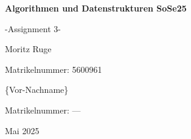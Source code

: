 \begin{titlepage}
    \centering
    \vspace*{3cm}
    {\Huge\bfseries Algorithmen und Datenstrukturen SoSe25 \par}
    \vspace{0.5cm}
    {\Huge -Assignment 3- \par}
    \vspace{1cm}
    {\Large Moritz Ruge \par}
    \vspace{0.1cm}
    {\small Matrikelnummer: 5600961 \par}
    {\Large \{Vor-Nachname\} \par}
    \vspace{0.1cm}
    {\small Matrikelnummer: ---\par}
    \vfill
    {\large Mai 2025}
\end{titlepage}